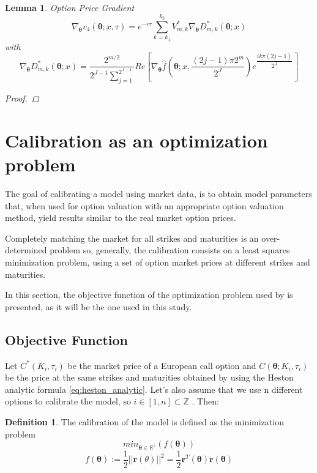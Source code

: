 \documentclass[12,twoside]{mammeTFM}
\newtheorem{lem}[thm]{Lemma}
\theoremstyle{definition}
\newtheorem{definition}[thm]{Definition}
\theoremstyle{remark}
\newcommand{\Z}{\ensuremath{\mathbb{Z}}}
\newcommand{\R}{\ensuremath{\mathbb{R}}}
\begin{document}
\begin{lem} Option Price Gradient
\begin{equation}
\nabla_{\boldsymbol{\theta}} v_4(\boldsymbol{\theta}; x, \tau) = e^{-r \tau} \sum_{k = k_1}^{k_2} V_{m, k}^{*} \nabla_{\boldsymbol{\theta}} D_{m,k}^{*}(\boldsymbol{\theta}; x)
\end{equation}
with
\begin{equation}
\nabla_{\boldsymbol{\theta}} D_{m,k}^{*} (\boldsymbol{\theta}; x) = \dfrac{2^{m/2}}{2^{J-1} \sum_{j=1}^{2^{J-1}}} Re \left[ 
\nabla_{\boldsymbol{\theta}} \hat{f}\left(\boldsymbol{\theta}; x, \dfrac{(2j - 1) \pi 2^m}{2^J}\right) e^{\dfrac{ik\pi(2j-1)}{2^J}}\right] 
\end{equation}
\begin{proof}

\end{proof}
\end{lem}

\section{Calibration as an optimization problem} \label{chap:optimization_problem}
The goal of calibrating a model using market data, is to obtain model parameters that, when used for option valuation with an appropriate option valuation method, yield results similar to the real market option prices.

Completely matching the market for all strikes and maturities is an over-determined problem so, generally, the calibration consists on a least squares minimization problem, using a set of option market prices at different strikes and maturities.

In this section, the objective function of the optimization problem used by \cite{cui17} is presented, as it will be the one used in this study.

\subsection{Objective Function}
Let $C^*(K_i, \tau_i)$ be the market price of a European call option and
 $C(\boldsymbol{\theta}; K_i, \tau_i)$ be the price at the same strikes and maturities obtained by using the Heston analytic formula \ref{eq:heston_analytic}. Let's also assume that we use n different options to calibrate the model, so 
 $i \in [1,n] \subset \Z$
 . Then:
 \begin{definition} The calibration of the model is defined as the minimization problem $$min_{\boldsymbol{\theta} \in \R^5} (f(\boldsymbol{\theta}))$$ $$f(\boldsymbol{\theta}) := \dfrac{1}{2}||\boldsymbol{r}(\theta)||^2 = \dfrac{1}{2} \boldsymbol{r}^T(\boldsymbol{\theta})\boldsymbol{r}(\boldsymbol{\theta})$$
\end{definition}
\end{document}
